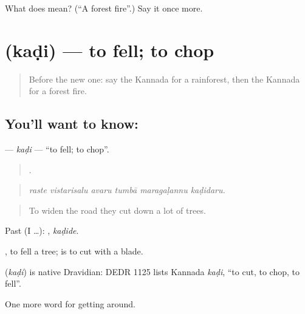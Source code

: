 \begin{tcolorbox}[breakable,colback=teal!4,colframe=teal!35!black,title={Before you move on}]
What does  mean? (\textquotedblleft{}A forest fire\textquotedblright{}.) Say it once more.
\end{tcolorbox}
\section[\texorpdfstring{\kn{ಕಡಿ} (kaḍi)}{ಕಡಿ (kaḍi)}]{ (kaḍi) — to fell; to chop}

\label{lesson:KA-C475-kadi-fell}



\begin{quote}
Before the new one: say the Kannada for a rainforest, then the Kannada for a forest fire.
\end{quote}

\subsection*{You'll want to know: }
\textbf{} — \emph{kaḍi} — \textquotedblleft{}to fell; to chop\textquotedblright{}.

\begin{quote}
     .
\end{quote}

\begin{quote}
\emph{raste vistarisalu avaru tumbā maragaḷannu kaḍidaru.}
\end{quote}

\begin{quote}
To widen the road they cut down a lot of trees.
\end{quote}

Past (I …): , \emph{kaḍide}.

 , to fell a tree;  is to cut with a blade.

\begin{cousinweb}
\textbf{} (\emph{kaḍi}) is native Dravidian: DEDR 1125 lists Kannada \emph{kaḍi}, \textquotedblleft{}to cut, to chop, to fell\textquotedblright{}.
\end{cousinweb}

\begin{grammarlens}[title={What you've built}]
One more word for getting around.
\end{grammarlens}

